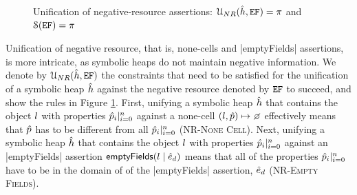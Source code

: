 \begin{figure}
{\scriptsize
{}}
\vspace*{-0.6cm}
\caption{Unification of negative-resource assertions: ${\cal U}_{NR}(\hat{h}, \mathtt{EF}) = \pi$ and ${\cal S}(\mathtt{EF}) = \pi$}
\label{fig:unineg}
\vspace*{-0.2cm}
\end{figure}

Unification of negative resource, that is, none-cells and \jsinline|emptyFields| assertions, is more intricate, as symbolic heaps do not maintain negative information. We denote by ${\cal U}_{NR}(\hat{h}, \mathtt{EF})$ the constraints that need to be satisfied for the unification of a symbolic heap $\hat{h}$ against the negative resource denoted by $\mathtt{EF}$ to succeed, and show the rules in Figure \ref{fig:unineg}. First, unifying a symbolic heap $\hat{h}$ that contains the object $l$ with properties $\hat{p}_i|_{i=0}^n$ against a none-cell $(\loc,\sexprp)\pointsto \none$ effectively means that $\hat{p}$ has to be different from all $\hat{p}_i|_{i=0}^n$ (\textsc{NR-None Cell}). Next, unifying a symbolic heap $\hat{h}$ that contains the object $l$ with properties $\hat{p}_i|_{i=0}^n$ against an  \jsinline|emptyFields| assertion $\mathsf{emptyFields}(l \mid \hat{e}_d)$ means that all of the properties $\hat{p}_i|_{i=0}^n$  have to be in the domain of of the \jsinline|emptyFields| assertion, $\hat{e}_d$ (\textsc{NR-Empty Fields}). 

